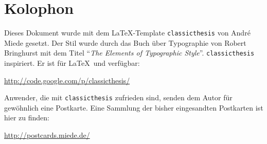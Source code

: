 
\pagestyle{empty}

\hfill

\vfill


\section*{Kolophon}

Dieses Dokument wurde mit dem LaTeX-Template \texttt{classicthesis} von Andr\'e
Miede gesetzt. Der Stil wurde durch das Buch über Typographie von Robert
Bringhurst mit dem Titel ``\emph{The Elements of Typographic Style}''.
\texttt{classicthesis} inspiriert. Er ist für \LaTeX\ und \mLyX verfügbar:

\begin{center}
\url{http://code.google.com/p/classicthesis/}
\end{center}

\noindent Anwender, die mit \texttt{classicthesis} zufrieden sind, senden dem
Autor für gewöhnlich eine Postkarte. Eine Sammlung der bisher eingesandten
Postkarten ist hier zu finden:

\begin{center}
\url{http://postcards.miede.de/}
\end{center}

\bigskip

\noindent\finalVersionString
